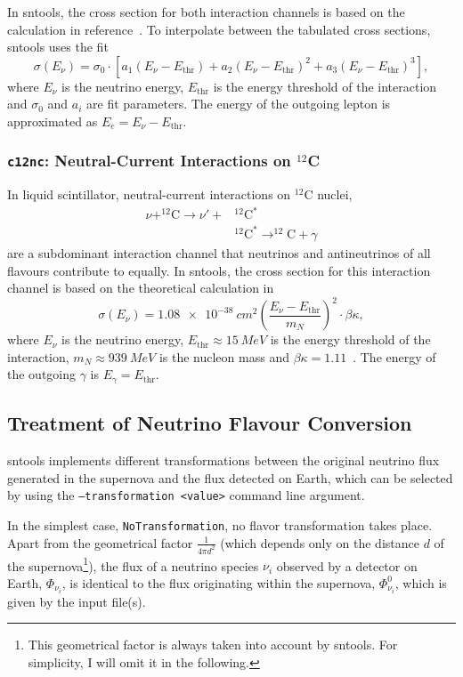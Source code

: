 \documentclass[11pt, oneside]{article}
\begin{document}
In sntools, the cross section for both interaction channels is based on the calculation in reference~\cite{Kolbe1999}.
To interpolate between the tabulated cross sections, sntools uses the fit
\begin{equation}
\sigma (E_\nu) = \sigma_0 \cdot \left[ a_1 (E_\nu - E_\text{thr}) + a_2 (E_\nu - E_\text{thr})^2 + a_3 (E_\nu - E_\text{thr})^3 \right],
\end{equation}
where $E_\nu$ is the neutrino energy, $E_\text{thr}$ is the energy threshold of the interaction and $\sigma_0$ and $a_i$ are fit parameters.
The energy of the outgoing lepton is approximated as $E_e = E_\nu - E_\text{thr}$.


\subsubsection{\texttt{c12nc}: Neutral-Current Interactions on $^{12}$C}
In liquid scintillator, neutral-current interactions on $^{12}$C nuclei,
\begin{align}
\nu + ^{12}\text{C} \rightarrow \nu' + &^{12}\text{C}^*\\
	&^{12}\text{C}^* \rightarrow ^{12}\text{C} + \gamma
\end{align}
are a subdominant interaction channel that neutrinos and antineutrinos of all flavours contribute to equally.
In sntools, the cross section for this interaction channel is based on the theoretical calculation in~\cite{Donnelly1979}
\begin{equation}
\sigma (E_\nu) = \SI{1.08e-38}{cm^2} \left( \frac{E_\nu - E_\text{thr}}{m_N} \right)^2 \cdot \beta \kappa,
\end{equation}
where $E_\nu$ is the neutrino energy, $E_\text{thr} \approx \SI{15}{MeV}$ is the energy threshold of the interaction, $m_N \approx \SI{939}{MeV}$ is the nucleon mass and $\beta \kappa = 1.11$~\cite{Armbruster1998}.
The energy of the outgoing $\gamma$ is $E_\gamma = E_\text{thr}$.


\subsection{Treatment of Neutrino Flavour Conversion} \label{sec:transformation}

sntools implements different transformations between the original neutrino flux generated in the supernova and the flux detected on Earth, which can be selected by using the \texttt{--transformation <value>} command line argument.

In the simplest case, \texttt{NoTransformation}, no flavor transformation takes place. Apart from the geometrical factor $\frac{1}{4 \pi d^2}$ (which depends only on the distance $d$ of the supernova\footnote{This geometrical factor is always taken into account by sntools. For simplicity, I will omit it in the following.}), the flux of a neutrino species $\nu_i$ observed by a detector on Earth, $\Phi_{\nu_i}$, is identical to the flux originating within the supernova, $\Phi_{\nu_i}^0$, which is given by the input file(s).
\end{document}
